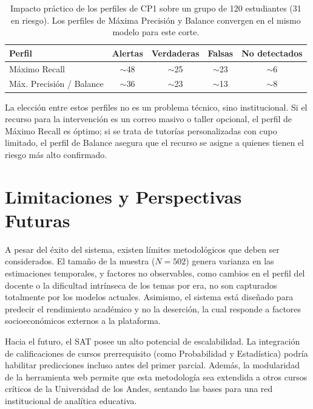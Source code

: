 \documentclass[12pt, letterpaper, openany]{report}
\begin{document}
\begin{table}[!ht]
  \centering
  \caption{Impacto práctico de los perfiles de CP1 sobre un grupo de 120 estudiantes (31 en riesgo). Los perfiles de Máxima Precisión y Balance convergen en el mismo modelo para este corte.}
  \label{tab:impacto_practico}
  \small
  \setlength{\tabcolsep}{4pt}
  \begin{tabularx}{\textwidth}{Xcccc}
    \toprule
    Perfil & Alertas & Verdaderas & Falsas & No detectados \\
    \midrule
    Máximo Recall & $\sim$48 & $\sim$25 & $\sim$23 & $\sim$6 \\ \addlinespace
    Máx. Precisión / Balance & $\sim$36 & $\sim$23 & $\sim$13 & $\sim$8 \\
    \bottomrule
  \end{tabularx}
\end{table}

\FloatBarrier

La elección entre estos perfiles no es un problema técnico, sino institucional. Si el recurso para la intervención es un correo masivo o taller opcional, el perfil de Máximo Recall es óptimo; si se trata de tutorías personalizadas con cupo limitado, el perfil de Balance asegura que el recurso se asigne a quienes tienen el riesgo más alto confirmado.

\section{Limitaciones y Perspectivas Futuras}

A pesar del éxito del sistema, existen límites metodológicos que deben ser considerados. El tamaño de la muestra ($N = 502$) genera varianza en las estimaciones temporales, y factores no observables, como cambios en el perfil del docente o la dificultad intrínseca de los temas por era, no son capturados totalmente por los modelos actuales. Asimismo, el sistema está diseñado para predecir el rendimiento académico y no la deserción, la cual responde a factores socioeconómicos externos a la plataforma.

Hacia el futuro, el SAT posee un alto potencial de escalabilidad. La integración de calificaciones de cursos prerrequisito (como Probabilidad y Estadística) podría habilitar predicciones incluso antes del primer parcial. Además, la modularidad de la herramienta web permite que esta metodología sea extendida a otros cursos críticos de la Universidad de los Andes, sentando las bases para una red institucional de analítica educativa.
\end{document}
